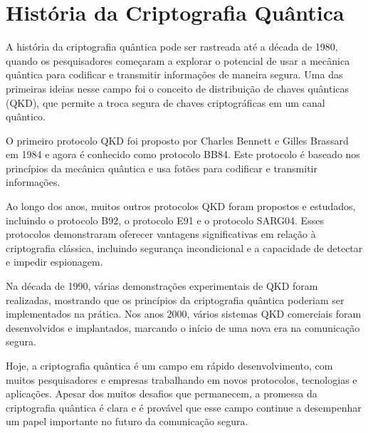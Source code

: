 \chapter{História da Criptografia Quântica}

A história da criptografia quântica pode ser rastreada até a década de 1980, quando os pesquisadores começaram a explorar o potencial de usar a mecânica quântica para codificar e transmitir informações de maneira segura. Uma das primeiras ideias nesse campo foi o conceito de distribuição de chaves quânticas (QKD), que permite a troca segura de chaves criptográficas em um canal quântico.

O primeiro protocolo QKD foi proposto por Charles Bennett e Gilles Brassard em 1984 e agora é conhecido como protocolo BB84. Este protocolo é baseado nos princípios da mecânica quântica e usa fotões para codificar e transmitir informações.

Ao longo dos anos, muitos outros protocolos QKD foram propostos e estudados, incluindo o protocolo B92, o protocolo E91 e o protocolo SARG04. Esses protocolos demonstraram oferecer vantagens significativas em relação à criptografia clássica, incluindo segurança incondicional e a capacidade de detectar e impedir espionagem.

Na década de 1990, várias demonstrações experimentais de QKD foram realizadas, mostrando que os princípios da criptografia quântica poderiam ser implementados na prática. Nos anos 2000, vários sistemas QKD comerciais foram desenvolvidos e implantados, marcando o início de uma nova era na comunicação segura.

Hoje, a criptografia quântica é um campo em rápido desenvolvimento, com muitos pesquisadores e empresas trabalhando em novos protocolos, tecnologias e aplicações. Apesar dos muitos desafios que permanecem, a promessa da criptografia quântica é clara e é provável que esse campo continue a desempenhar um papel importante no futuro da comunicação segura.

\newpage
